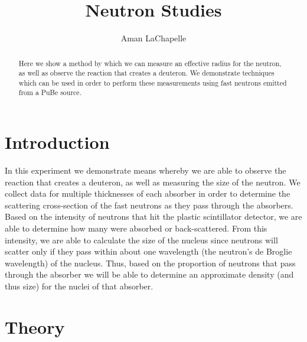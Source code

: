 \documentclass{article}
\title{Neutron Studies}
\author{Aman LaChapelle}
\begin{document}
\raggedright
\maketitle

\begin{abstract}
  Here we show a method by which we can measure an effective radius for the neutron, as well as observe the reaction that creates a deuteron.  We demonstrate techniques which can be used in order to perform these measurements using fast neutrons emitted from a PuBe source.
\end{abstract}

\tableofcontents
\newpage

\section{Introduction}
  In this experiment we demonstrate means whereby we are able to observe the reaction that creates a deuteron, as well as measuring the size of the neutron.  We collect data for multiple thicknesses of each absorber in order to determine the scattering cross-section of the fast neutrons as they pass through the absorbers.  Based on the intensity of neutrons that hit the plastic scintillator detector, we are able to determine how many were absorbed or back-scattered.  From this intensity, we are able to calculate the size of the nucleus since neutrons will scatter only if they pass within about one wavelength (the neutron's de Broglie wavelength) of the nucleus.  Thus, based on the proportion of neutrons that pass through the absorber we will be able to determine an approximate density (and thus size) for the nuclei of that absorber.

\section{Theory}
\end{document}
